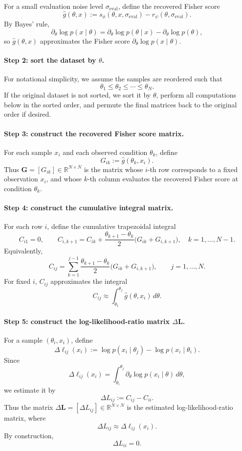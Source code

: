 For a small evaluation noise level \(\sigma_{\mathrm{eval}}\), define the recovered Fisher score
\[
\hat g(\theta,x)
:=
s_{\phi}(\theta,x,\sigma_{\mathrm{eval}})
-
r_{\psi}(\theta,\sigma_{\mathrm{eval}}).
\]
By Bayes' rule,
\[
\partial_\theta \log p(x\mid \theta)
=
\partial_\theta \log p(\theta\mid x)-\partial_\theta \log p(\theta),
\]
so \(\hat g(\theta,x)\) approximates the Fisher score \(\partial_\theta \log p(x\mid \theta)\).

\paragraph{Step 2: sort the dataset by \(\theta\).}
For notational simplicity, we assume the samples are reordered such that
\[
\theta_1\le \theta_2\le \cdots \le \theta_N.
\]
If the original dataset is not sorted, we sort it by \(\theta\), perform all computations below in the sorted order, and permute the final matrices back to the original order if desired.

\paragraph{Step 3: construct the recovered Fisher score matrix.}
For each sample \(x_i\) and each observed condition \(\theta_k\), define
\[
G_{ik}:=\hat g(\theta_k,x_i).
\]
Thus \(\mathbf G=[G_{ik}]\in\mathbb R^{N\times N}\) is the matrix whose \(i\)-th row corresponds to a fixed observation \(x_i\), and whose \(k\)-th column evaluates the recovered Fisher score at condition \(\theta_k\).

\paragraph{Step 4: construct the cumulative integral matrix.}
For each row \(i\), define the cumulative trapezoidal integral
\[
C_{i1}=0,
\qquad
C_{i,k+1}
=
C_{ik}
+
\frac{\theta_{k+1}-\theta_k}{2}\bigl(G_{ik}+G_{i,k+1}\bigr),
\quad k=1,\dots,N-1.
\]
Equivalently,
\[
C_{ij}
=
\sum_{k=1}^{j-1}
\frac{\theta_{k+1}-\theta_k}{2}\bigl(G_{ik}+G_{i,k+1}\bigr),
\qquad j=1,\dots,N.
\]
For fixed \(i\), \(C_{ij}\) approximates the integral
\[
C_{ij}\approx \int_{\theta_1}^{\theta_j}\hat g(\theta,x_i)\,d\theta.
\]

\paragraph{Step 5: construct the log-likelihood-ratio matrix \(\Delta \mathbf L\).}
For a sample \((\theta_i,x_i)\), define
\[
\Delta \ell_{ij}(x_i)
:=
\log p(x_i\mid \theta_j)-\log p(x_i\mid \theta_i).
\]
Since
\[
\Delta \ell_{ij}(x_i)
=
\int_{\theta_i}^{\theta_j}\partial_\theta \log p(x_i\mid \theta)\,d\theta,
\]
we estimate it by
\[
\Delta L_{ij}:=C_{ij}-C_{ii}.
\]
Thus the matrix \(\Delta \mathbf L=[\Delta L_{ij}]\in\mathbb R^{N\times N}\) is the estimated log-likelihood-ratio matrix, where
\[
\Delta L_{ij}\approx \Delta \ell_{ij}(x_i).
\]
By construction,
\[
\Delta L_{ii}=0.
\]

